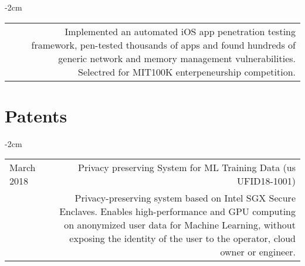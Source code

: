 \documentclass[lettersize,10pt]{article}
\begin{document}
\begin{adjustwidth}{}{-2cm}
\begin{tabularx}{\textwidth}{L R}
	& Implemented an automated iOS app penetration testing framework, pen-tested thousands of apps and found hundreds of generic network and
	  memory management vulnerabilities. Selectred for MIT100K enterpeneurship competition. \\
\end{tabularx}
\end{adjustwidth}

\section{Patents}
\begin{adjustwidth}{}{-2cm}
  \begin{tabularx}{\textwidth}{L R}
    March 2018 & {\sc Privacy preserving System for ML Training Data (us UFID18-1001)} \\
	& Privacy-preserving system based on Intel SGX Secure Enclaves. Enables high-performance and GPU computing on anonymized user data
    for Machine Learning, without exposing the identity of the user to the operator, cloud owner or engineer. \\
  \end{tabularx}
\end{adjustwidth}

\end{document}
